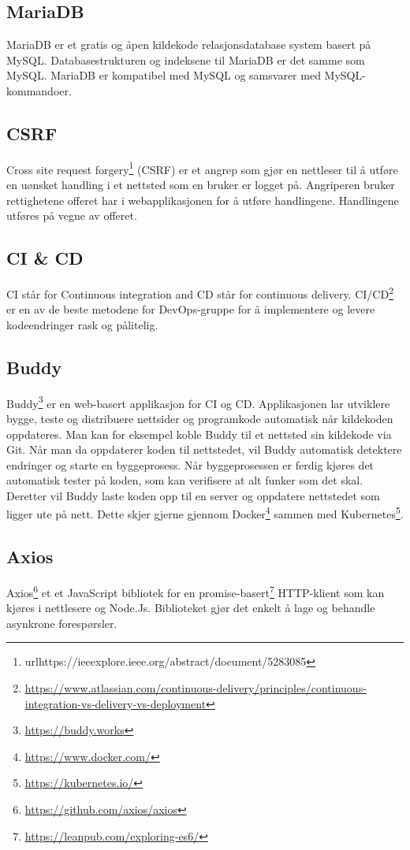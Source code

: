 \subsection{MariaDB}
MariaDB er et gratis og åpen kildekode relasjonsdatabase system basert på MySQL. Databasestrukturen og indeksene til MariaDB er det samme som MySQL. MariaDB er kompatibel med MySQL og samsvarer med MySQL-kommandoer. 

\subsection{CSRF}
Cross site request forgery\footnote{url{https://ieeexplore.ieee.org/abstract/document/5283085}} (CSRF) er et angrep som gjør en nettleser til å utføre en uønsket handling i et nettsted som en bruker er logget på. Angriperen bruker rettighetene offeret har i webapplikasjonen for å utføre handlingene. Handlingene utføres på vegne av offeret.

\subsection{CI \& CD}
CI står for Continuous integration and CD står for continuous delivery. CI/CD\footnote{\url{https://www.atlassian.com/continuous-delivery/principles/continuous-integration-vs-delivery-vs-deployment}} er en av de beste metodene for DevOps-gruppe for å implementere og levere kodeendringer rask og pålitelig. 

\subsection{Buddy}
Buddy\footnote{\url{https://buddy.works}} er en web-basert applikasjon for CI og CD. Applikasjonen lar utviklere bygge, teste og distribuere nettsider og programkode automatisk når kildekoden oppdateres. Man kan for eksempel koble Buddy til et nettsted sin kildekode via Git. Når man da oppdaterer koden til nettstedet, vil Buddy automatisk detektere endringer og starte en byggeprosess. Når byggeprosessen er ferdig kjøres det automatisk tester på koden, som kan verifisere at alt funker som det skal. Deretter vil Buddy laste koden opp til en server og oppdatere nettstedet som ligger ute på nett. Dette skjer gjerne gjennom Docker\footnote{\url{https://www.docker.com/}} sammen med Kubernetes\footnote{\url{https://kubernetes.io/}}.

\subsection{Axios}
Axios\footnote{\url{https://github.com/axios/axios}} et et JavaScript bibliotek for en promise-basert\footnote{\url{https://leanpub.com/exploring-es6/}} HTTP-klient som kan kjøres i nettlesere og Node.Js. Biblioteket gjør det enkelt å lage og behandle asynkrone forespørsler.


